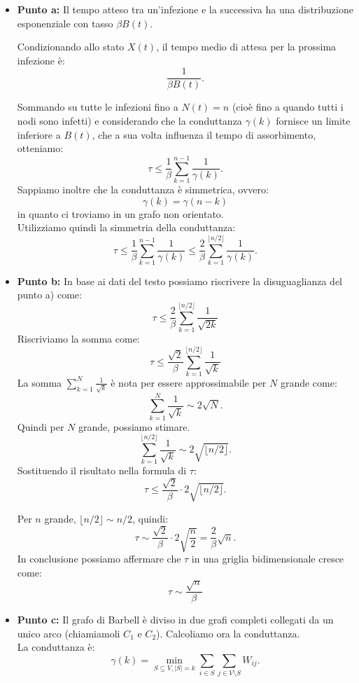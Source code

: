 \documentclass[a4paper,12pt]{article}
\begin{document}
	\begin{itemize}
		\item \textbf{Punto a: }
		Il tempo atteso tra un'infezione e la successiva ha una distribuzione esponenziale con tasso \(\beta B(t)\).
		
		Condizionando allo stato \(X(t)\), il tempo medio di attesa per la prossima infezione è:
		\[
		\frac{1}{\beta B(t)}.
		\]
		
		Sommando su tutte le infezioni fino a \(N(t) = n\) (cioè fino a quando tutti i nodi sono infetti) e considerando che la conduttanza \(\gamma(k)\) fornisce un limite inferiore a \(B(t)\), che a sua volta influenza il tempo di assorbimento, otteniamo:
		\[
		\tau \leq \frac{1}{\beta} \sum_{k=1}^{n-1} \frac{1}{\gamma(k)}.
		\]
		Sappiamo inoltre che la conduttanza è simmetrica, ovvero:\\
		\[
		\gamma(k)=\gamma(n-k)
		\]
		in quanto ci troviamo in un grafo non orientato.\\
		
		Utilizziamo quindi la simmetria della conduttanza:
		\[
		\tau \leq \frac{1}{\beta} \sum_{k=1}^{n-1} \frac{1}{\gamma(k)} \leq \frac{2}{\beta} \sum_{k=1}^{\lfloor n/2 \rfloor} \frac{1}{\gamma(k)}.
		\]
		\item \textbf{Punto b: }
		In base ai dati del testo possiamo riscrivere la disuguaglianza del punto a) come:\\
		\[
		\tau \leq \frac{2}{\beta} \sum_{k=1}^{\lfloor n/2 \rfloor} \frac{1}{\sqrt{2k}}
		\]
		Riscriviamo la somma come:\\
		\[
		\tau \leq \frac{\sqrt{2}}{\beta} \sum_{k=1}^{\lfloor n/2 \rfloor} \frac{1}{\sqrt{k}}
		\]
		La somma \(\sum_{k=1}^N \frac{1}{\sqrt{k}}\) è nota per essere approssimabile per \(N\) grande come:
		\[
		\sum_{k=1}^N \frac{1}{\sqrt{k}} \sim 2\sqrt{N}.
		\]
		Quindi per $N$ grande, possiamo stimare.\\
		\[
		\sum_{k=1}^{\lfloor n/2 \rfloor} \frac{1}{\sqrt{k}} \sim 2\sqrt{\lfloor n/2 \rfloor}.
		\]
		Sostituendo il risultato nella formula di \(\tau\):
		\[
		\tau \leq \frac{\sqrt{2}}{\beta} \cdot 2\sqrt{\lfloor n/2 \rfloor}.
		\]
		
		Per \(n\) grande, \(\lfloor n/2 \rfloor \sim n/2\), quindi:
		\[
		\tau \sim \frac{\sqrt{2}}{\beta} \cdot 2\sqrt{\frac{n}{2}} = \frac{2}{\beta} \sqrt{n}.
		\]
		In conclusione possiamo affermare che $\tau$ in una griglia bidimensionale cresce come:\\
		\[
		\tau \sim \frac{\sqrt{n}}{\beta}
		\]
		\item \textbf{Punto c: } Il grafo di Barbell è diviso in due grafi completi collegati da un unico arco (chiamiamoli $C_1$ e $C_2$).
		Calcoliamo ora la conduttanza.\\
		La conduttanza è:
		\[
		\gamma(k) = \min_{S \subseteq V, |S|=k} \sum_{i \in S} \sum_{j \in V \setminus S} W_{ij}.
		\]
		

\end{itemize}
\end{document}
